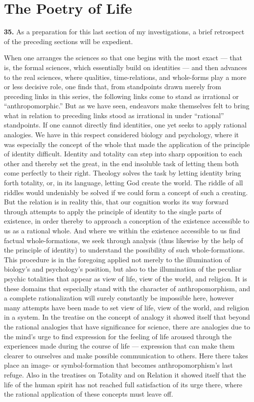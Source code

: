 \documentclass[12pt]{book}
\newcommand{\hnum}[1]{\textbf{#1.}\enspace}
\newcommand{\opage}[1]{\marginnote{\footnotesize\textit{[#1]}}}
\begin{document}
\chapter{The Poetry of Life}
\label{ch:7}

\opage{116}\hnum{35} As a preparation for this last section of my investigations, a brief retrospect of the
preceding sections will be expedient.

When one arranges the sciences so that one begins with the most exact --- that is, the formal sciences,
which essentially build on identities --- and then advances to the real sciences, where qualities,
time-relations, and whole-forms play a more or less decisive role, one finds that, from standpoints drawn
merely from preceding links in this series, the following links come to stand as irrational or
``anthropomorphic.'' But as we have seen, endeavors make themselves felt to bring what in relation to
preceding links stood as irrational in under ``rational'' standpoints. If one cannot directly find
identities, one yet seeks to apply rational analogies. We have in this respect considered biology and
psychology, where it was especially the concept of the whole that made the application of the principle of
identity difficult. Identity and totality can step into sharp opposition to each other and thereby set the
great, in the end insoluble task of letting them both come perfectly to their right. Theology solves the
task by letting identity bring forth totality, or, in its language, letting God create the world. The
riddle of all riddles would undeniably be solved if we could form a concept \opage{117}of such a creating. But the
relation is in reality this, that our cognition works its way forward through attempts to apply the
principle of identity to the single parts of existence, in order thereby to approach a conception of the
existence accessible to us as a rational whole. And where we within the existence accessible to us find
factual whole-formations, we seek through analysis (thus likewise by the help of the principle of identity)
to understand the possibility of such whole-formations. This procedure is in the foregoing applied not
merely to the illumination of biology's and psychology's position, but also to the illumination of the
peculiar psychic totalities that appear as view of life, view of the world, and religion. It is these
domains that especially stand with the character of anthropomorphism, and a complete rationalization will
surely constantly be impossible here, however many attempts have been made to set view of life, view of the
world, and religion in a system. In the treatise on the concept of analogy it showed itself that beyond
the rational analogies that have significance for science, there are analogies due to the mind's urge to
find expression for the feeling of life aroused through the experiences made during the course of life ---
expression that can make them clearer to ourselves and make possible communication to others. Here there
takes place an image- or symbol-formation that becomes anthropomorphism's last refuge. Also in the
treatises on Totality and on Relation it showed itself that the life of the human spirit has not reached full
satisfaction of its urge there, where the rational application of these concepts must leave off.
\end{document}

